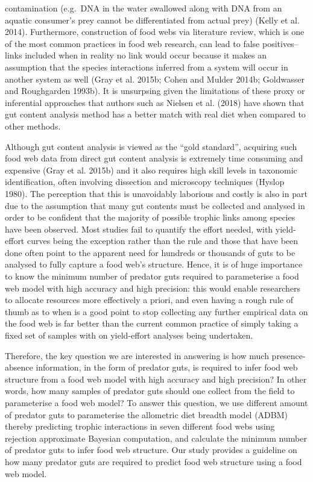 \documentclass{article}
\begin{document}
contamination (e.g.~DNA in the water swallowed along with DNA from an
aquatic consumer's prey cannot be differentiated from actual prey)
(Kelly et al. 2014). Furthermore, construction of food webs via
literature review, which is one of the most common practices in food web
research, can lead to false positives--links included when in reality no
link would occur because it makes an assumption that the species
interactions inferred from a system will occur in another system as well
(Gray et al. 2015b; Cohen and Mulder 2014b; Goldwasser and Roughgarden
1993b). It is unsurpsing given the limitations of these proxy or
inferential approaches that authors such as Nielsen et al. (2018) have
shown that gut content analysis method has a better match with real diet
when compared to other methods.

Although gut content analysis is viewed as the ``gold standard'',
acquiring such food web data from direct gut content analysis is
extremely time consuming and expensive (Gray et al. 2015b) and it also
requires high skill levels in taxonomic identification, often involving
dissection and microscopy techniques (Hyslop 1980). The perception that
this is unavoidably laborious and costly is also in part due to the
assumption that many gut contents must be collected and analysed in
order to be confident that the majority of possible trophic links among
species have been observed. Most studies fail to quantify the effort
needed, with yield-effort curves being the exception rather than the
rule and those that have been done often point to the apparent need for
hundreds or thousands of guts to be analysed to fully capture a food
web's structure. Hence, it is of huge importance to know the minimum
number of predator guts required to parameterise a food web model with
high accuracy and high precision: this would enable researchers to
allocate resources more effectively a priori, and even having a rough
rule of thumb as to when is a good point to stop collecting any further
empirical data on the food web is far better than the current common
practice of simply taking a fixed set of samples with on yield-effort
analyses being undertaken.

Therefore, the key question we are interested in answering is how much
presence-absence information, in the form of predator guts, is required
to infer food web structure from a food web model with high accuracy and
high precision? In other words, how many samples of predator guts should
one collect from the field to parameterise a food web model? To answer
this question, we use different amount of predator guts to parameterise
the allometric diet breadth model (ADBM) thereby predicting trophic
interactions in seven different food webs using rejection approximate
Bayesian computation, and calculate the minimum number of predator guts
to infer food web structure. Our study provides a guideline on how many
predator guts are required to predict food web structure using a food
web model.
\end{document}
